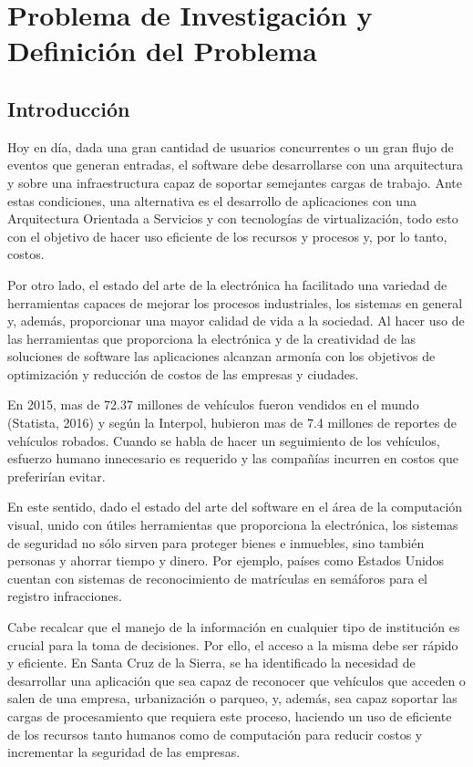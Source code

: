 \chapter{Problema de Investigación y Definición del Problema}
\section{Introducción}

\color{mypink2}
    Hoy en día, dada una gran cantidad de usuarios concurrentes o un gran flujo de eventos que generan entradas, el software debe desarrollarse con una arquitectura y sobre una infraestructura capaz de soportar semejantes cargas de trabajo. Ante estas condiciones, una alternativa es el desarrollo de aplicaciones con una Arquitectura Orientada a Servicios y con tecnologías de virtualización, todo esto con el objetivo de hacer uso eficiente de los recursos y procesos y, por lo tanto, costos.
    
    Por otro lado, el estado del arte de la electrónica ha facilitado una variedad de herramientas capaces de mejorar los procesos industriales, los sistemas en general y, además, proporcionar una mayor calidad de vida a la sociedad. Al hacer uso de las herramientas que proporciona la electrónica y de la creatividad de las soluciones de software las aplicaciones alcanzan armonía con los objetivos de optimización y reducción de costos de las empresas y ciudades. 
    
    En 2015, mas de 72.37 millones de vehículos fueron vendidos en el mundo (Statista, 2016) y según la Interpol, hubieron mas de 7.4 millones de reportes de vehículos robados. Cuando se habla de hacer un seguimiento de los vehículos, esfuerzo humano innecesario es requerido y las compañías incurren en costos que preferirían evitar.
    
    En este sentido, dado el  estado del arte del software en el área de la computación visual, unido con útiles herramientas que proporciona la electrónica, los sistemas de seguridad no sólo sirven para proteger bienes e inmuebles, sino también personas y ahorrar tiempo y dinero. Por ejemplo, países como Estados Unidos cuentan con sistemas de reconocimiento de matrículas en semáforos para el registro infracciones. 
    
    Cabe recalcar que el manejo de la información en cualquier tipo de institución es crucial para la toma de decisiones. Por ello, el acceso a la misma debe ser rápido y eficiente. En Santa Cruz de la Sierra, se ha identificado la necesidad de desarrollar una aplicación que sea capaz de reconocer que vehículos que acceden o salen de una empresa, urbanización o parqueo, y, además, sea capaz soportar las cargas de procesamiento que requiera este proceso, haciendo un uso de eficiente de los recursos tanto humanos como de computación para reducir costos y incrementar la seguridad de las empresas.
\color{black}
